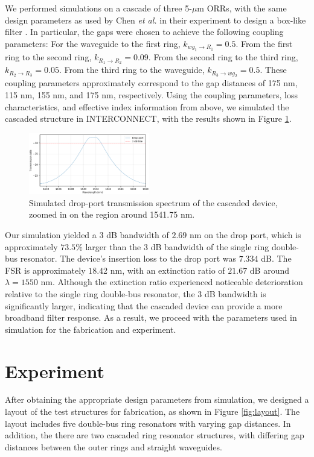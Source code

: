 \documentclass[letterpaper, 10 pt, conference]{ieeeconf}
\begin{document}
We performed simulations on a cascade of three 5-$\mu$m ORRs, with the same design parameters as used by Chen \textit{et al.} in their experiment to design a box-like filter \cite{cascaderings}. In particular, the gaps were chosen to achieve the following coupling parameters: For the waveguide to the first ring, $k_{wg_1 \to R_1} = 0.5$. From the first ring to the second ring, $k_{R_1\to R_2} = 0.09$. From the second ring to the third ring, $k_{R_2 \to R_3} = 0.05$. From the third ring to the waveguide, $k_{R_3 \to wg_2} = 0.5$. These coupling parameters approximately correspond to the gap distances of 175 nm, 115 nm, 155 nm, and 175 nm, respectively. Using the coupling parameters, loss characteristics, and effective index information from above, we simulated the cascaded structure in INTERCONNECT, with the results shown in Figure \ref{fig:sim_cascade}. 

\begin{figure}[!ht]
    \centering
    \includegraphics[width = 0.47\textwidth]{sim_cascade.png}
    \caption{Simulated drop-port transmission spectrum of the cascaded device, zoomed in on the region around 1541.75 nm.}
    \label{fig:sim_cascade}
\end{figure} 

Our simulation yielded a 3 dB bandwidth of $2.69$ nm on the drop port, which is approximately $73.5\%$ larger than the 3 dB bandwidth of the single ring double-bus resonator. The device's insertion loss to the drop port was $7.334$ dB. The FSR is approximately $18.4$2 nm, with an extinction ratio of $21.67$ dB around $\lambda = 1550$ nm. Although the extinction ratio experienced noticeable deterioration relative to the single ring double-bus resonator, the 3 dB bandwidth is significantly larger, indicating that the cascaded device can provide a more broadband filter response. As a result, we proceed with the parameters used in simulation for the fabrication and experiment. 


\section{Experiment}

After obtaining the appropriate design parameters from simulation, we designed a layout of the test structures for fabrication, as shown in Figure \ref{fig:layout}. The layout includes five double-bus ring resonators with varying gap distances. In addition, the there are two cascaded ring resonator structures, with differing gap distances between the outer rings and straight waveguides. 
\end{document}
